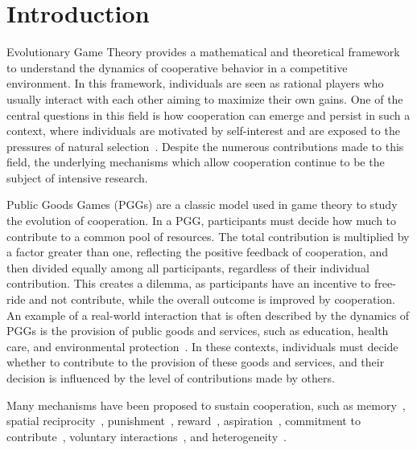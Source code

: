 \documentclass[twocolumn,aps,amsmath,pre,floatfix,superscriptaddress]{revtex4-2}
\begin{document}
\maketitle

\section{Introduction}
\label{intro}


Evolutionary Game Theory provides a mathematical and theoretical framework to understand the dynamics of cooperative behavior in a competitive environment. In this framework, individuals are seen as rational players who usually interact with each other aiming to maximize their own gains. One of the central questions in this field is how cooperation can emerge and persist in such a context, where individuals are motivated by self-interest and are exposed to the pressures of natural selection~\cite{bergstrom2002evolution}. 
Despite the numerous contributions made to this field, the underlying mechanisms  which allow cooperation continue to be the subject of intensive research.

Public Goods Games (PGGs) are a classic model used in game theory to study the evolution of cooperation. In a PGG, participants must decide how much to contribute to a common pool of resources. The total contribution is multiplied by a factor greater than one, reflecting the positive feedback of cooperation, and then divided equally among all participants, regardless of their individual contribution. This creates a dilemma, as participants have an incentive to free-ride and not contribute, while the overall outcome is improved by cooperation.
%
An  example of a real-world interaction that is often described by the dynamics of PGGs is the provision of public goods and services, such as education, health care, and environmental protection~\cite{gois2019reward}. In these contexts, individuals must decide whether to contribute to the provision of these goods and services, and their decision is influenced by the level of contributions made by others.

Many mechanisms have been proposed to sustain cooperation, such as memory~\cite{santos2011evolution}, spatial reciprocity~\cite{ohtsuki2006simple,tarnita2009strategy,Wang2012,hindersin2014counterintuitive,allen2014games, FLORES2022112744}, punishment~\cite{FLORES2021110737,brandt2003punishment,chen2014probabilistic}, reward~\cite{szolnoki2010reward}, aspiration~\cite{amaral2016stochastic, shi2021dynamic}, commitment to contribute~\cite{han2017evolution}, voluntary interactions~\cite{hauert2003prisoner}, and heterogeneity~\cite{perc2015double, perc2011does, shi2010group,attila_heterog, attila_heterog2, marco_heterog, CAO20101273, kun2013resource}.
%
\end{document}

